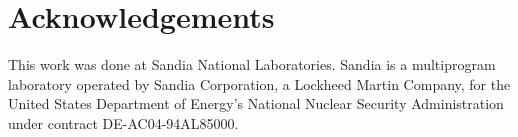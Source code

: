 \documentclass[twocolumn]{article}
\begin{document}
\section{Acknowledgements}

This work was done at Sandia National Laboratories.  Sandia is a
multiprogram laboratory operated by Sandia Corporation, a Lockheed Martin
Company, for the United States Department of Energy's National Nuclear
Security Administration under contract DE-AC04-94AL85000.



\end{document}
